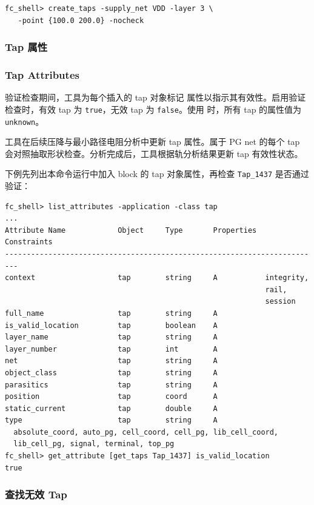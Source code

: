 \begin{lstlisting}
fc_shell> create_taps -supply_net VDD -layer 3 \
   -point {100.0 200.0} -nocheck
\end{lstlisting}

\subsubsection{Tap 属性}
\subsubsection*{Tap Attributes}

验证检查期间，工具为每个插入的 tap 对象标记  属性以指示其有效性。启用验证检查时，有效 tap 为 \texttt{true}，无效 tap 为 \texttt{false}。使用  时，所有 tap 的属性值为 \texttt{unknown}。

工具在后续压降与最小路径电阻分析中更新 tap 属性。属于 PG net 的每个 tap 会对照抽取形状检查。分析完成后，工具根据轨分析结果更新 tap 有效性状态。

下例先列出本命令运行中加入 block 的 tap 对象属性，再检查 \texttt{Tap\_1437} 是否通过验证：
\begin{lstlisting}
fc_shell> list_attributes -application -class tap
...
Attribute Name            Object     Type       Properties  Constraints
-------------------------------------------------------------------------
context                   tap        string     A           integrity,
                                                            rail,
                                                            session
full_name                 tap        string     A
is_valid_location         tap        boolean    A
layer_name                tap        string     A
layer_number              tap        int        A
net                       tap        string     A
object_class              tap        string     A
parasitics                tap        string     A
position                  tap        coord      A
static_current            tap        double     A
type                      tap        string     A
  absolute_coord, auto_pg, cell_coord, cell_pg, lib_cell_coord,
  lib_cell_pg, signal, terminal, top_pg
fc_shell> get_attribute [get_taps Tap_1437] is_valid_location
true
\end{lstlisting}

\subsubsection{查找无效 Tap}
